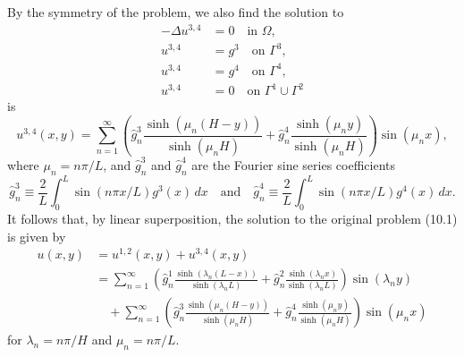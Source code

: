 By the symmetry of the problem, we also find the solution to
\begin{equation*}
    \begin{aligned}
        -\Delta u^{3,4} &= 0 \quad \text{in } \Omega, \\
        u^{3,4} &= g^3 \quad \text{on } \Gamma^3, \\
        u^{3,4} &= g^4 \quad \text{on } \Gamma^4, \\
        u^{3,4} &= 0 \quad \text{on } \Gamma^1 \cup \Gamma^2
    \end{aligned} \tag{10.5}
\end{equation*}
is
\[u^{3,4}(x, y) = \sum_{n=1}^{\infty} \left(\hat{g}_n^3\frac{\sinh(\mu_n(H - y))}{\sinh(\mu_nH)} + \hat{g}_n^4\frac{\sinh(\mu_ny)}{\sinh(\mu_nH)}\right)\sin(\mu_nx),\]
where $\mu_n = n\pi/L$, and $\hat{g}_n^3$ and $\hat{g}_n^4$ are the Fourier sine series coefficients
\[\hat{g}_n^3 \equiv \frac{2}{L} \int_0^L \sin(n\pi x/L)g^3(x)\,dx \quad \text{and} \quad \hat{g}_n^4 \equiv \frac{2}{L} \int_0^L \sin(n\pi x/L)g^4(x)\,dx.\]
It follows that, by linear superposition, the solution to the original problem (10.1) is given by
\begin{align*}
    u(x, y) &= u^{1,2}(x, y) + u^{3,4}(x, y) \\
    &= \sum_{n=1}^{\infty} \left(\hat{g}_n^1\frac{\sinh(\lambda_n(L - x))}{\sinh(\lambda_nL)} + \hat{g}_n^2\frac{\sinh(\lambda_nx)}{\sinh(\lambda_nL)}\right)\sin(\lambda_ny) \\
    &\quad + \sum_{n=1}^{\infty} \left(\hat{g}_n^3\frac{\sinh(\mu_n(H - y))}{\sinh(\mu_nH)} + \hat{g}_n^4\frac{\sinh(\mu_ny)}{\sinh(\mu_nH)}\right)\sin(\mu_nx)
\end{align*}
for $\lambda_n = n\pi/H$ and $\mu_n = n\pi/L$.

